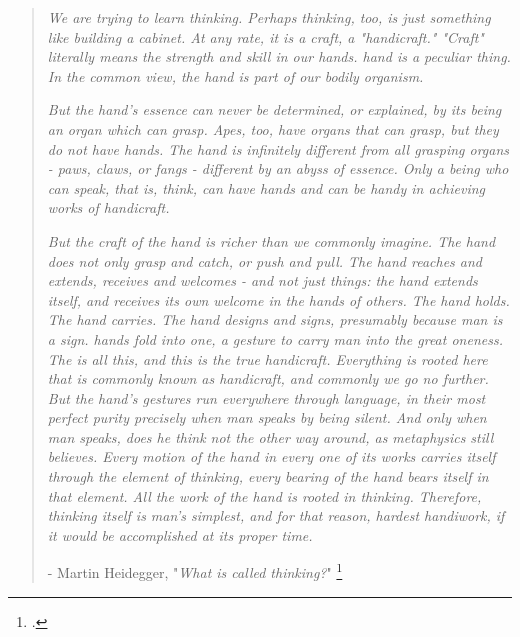 \begin{quotation}
\textit{We are trying to learn thinking. Perhaps thinking, too, is just something like building a cabinet. At any rate, it is a craft, a "handicraft." "Craft" literally means the strength and skill in our hands. hand is a peculiar thing. In the common view, the hand is part of our bodily organism.}

\textit{But the hand's essence can never be determined, or explained, by its being an organ which can grasp. Apes, too, have organs that can grasp, but they do not have hands. The hand is infinitely different from all grasping organs - paws, claws, or fangs - different by an abyss of essence. Only a being who can speak, that is, think, can have hands and can be handy in achieving works of handicraft. }

\textit{But the craft of the hand is richer than we commonly imagine. The hand does not only grasp and catch, or push and pull. The hand reaches and extends, receives and welcomes - and not just things: the hand extends itself, and receives its own welcome in the hands of others. The hand holds. The hand carries. The hand designs and signs, presumably because man is a sign. hands fold into one, a gesture to carry man into the great oneness. The is all this, and this is the true handicraft. Everything is rooted here that is commonly known as handicraft, and commonly we go no further. But the hand's gestures run everywhere through language, in their most perfect purity precisely when man speaks by being silent. And only when man speaks, does he think not the other way around, as metaphysics still believes. Every motion of the hand in every one of its works carries itself through the element of thinking, every bearing of the hand bears itself in that element. All the work of the hand is rooted in thinking. Therefore, thinking itself is man's simplest, and for that reason, hardest handiwork, if it would be accomplished at its proper time.}
\\

\begin{flushright}
- Martin Heidegger, "\textit{What is called thinking?}" \footcite{Heidegger1968}
\end{flushright}
\end{quotation}